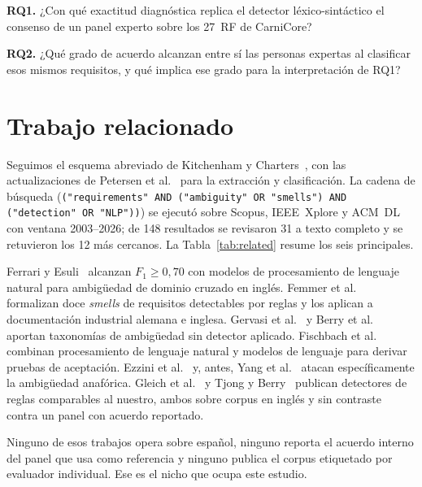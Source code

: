 \documentclass[runningheads]{llncs}
\begin{document}
\medskip
\noindent\textbf{RQ1.} ¿Con qué exactitud diagnóstica replica el detector
léxico-sintáctico el consenso de un panel experto sobre los 27~RF de CarniCore?

\noindent\textbf{RQ2.} ¿Qué grado de acuerdo alcanzan entre sí las personas
expertas al clasificar esos mismos requisitos, y qué implica ese grado para la
interpretación de RQ1?

\section{Trabajo relacionado}
\label{sec:related}

Seguimos el esquema abreviado de Kitchenham y Charters~\cite{kitchenham2007},
con las actualizaciones de Petersen et al.~\cite{petersen2015mapping} para la
extracción y clasificación.
La cadena de búsqueda (\texttt{("requirements" AND ("ambiguity" OR "smells")
AND ("detection" OR "NLP"))}) se ejecutó sobre Scopus, IEEE~Xplore y ACM~DL con
ventana 2003--2026; de 148 resultados se revisaron 31 a texto completo y se
retuvieron los 12 más cercanos. La Tabla~\ref{tab:related} resume los seis
principales.

Ferrari y Esuli~\cite{ferrari2019nlp} alcanzan $F_1 \geq 0{,}70$ con modelos de
procesamiento de lenguaje natural para ambigüedad de dominio cruzado en inglés.
Femmer et al.~\cite{femmer2017smells} formalizan doce \textit{smells} de
requisitos detectables por reglas y los aplican a documentación industrial
alemana e inglesa. Gervasi et al.~\cite{gervasi2019ambiguity} y Berry et
al.~\cite{berry2003ambiguity} aportan taxonomías de ambigüedad sin detector
aplicado. Fischbach et al.~\cite{fischbach2023acceptance} combinan
procesamiento de lenguaje natural y modelos de lenguaje para derivar pruebas de
aceptación. Ezzini et al.~\cite{ezzini2022automated} y, antes,
Yang et al.~\cite{yang2011anaphoric} atacan específicamente la ambigüedad
anafórica. Gleich et al.~\cite{gleich2010ambiguity} y Tjong y
Berry~\cite{tjong2013sree} publican detectores de reglas comparables al
nuestro, ambos sobre corpus en inglés y sin contraste contra un panel con
acuerdo reportado.

Ninguno de esos trabajos opera sobre español, ninguno reporta el acuerdo
interno del panel que usa como referencia y ninguno publica el corpus etiquetado
por evaluador individual. Ese es el nicho que ocupa este estudio.
\end{document}
